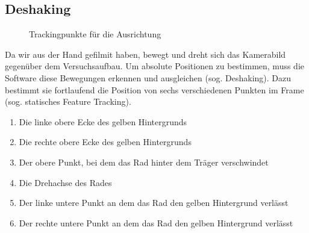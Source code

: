 \documentclass[a4paper,german,12pt,smallheadings]{scrartcl}
\begin{document}
\subsection{Deshaking}
\begin{figure}
  \caption{Trackingpunkte für die Ausrichtung}
\end{figure}

Da wir aus der Hand gefilmit haben, bewegt und dreht sich das Kamerabild
gegenüber dem Versuchsaufbau. Um absolute Positionen zu bestimmen, muss die
Software diese Bewegungen erkennen und ausgleichen (sog. Deshaking). Dazu
bestimmt sie fortlaufend die Position von sechs verschiedenen Punkten im Frame
(sog. statisches Feature Tracking).
\begin{enumerate}
  \item Die linke obere Ecke des gelben Hintergrunds
  \item Die rechte obere Ecke des gelben Hintergrunds
  \item Der obere Punkt, bei dem das Rad hinter dem Träger verschwindet
  \item Die Drehachse des Rades
  \item Der linke untere Punkt an dem das Rad den gelben Hintergrund verlässt
  \item Der rechte untere Punkt an dem das Rad den gelben Hintergrund verlässt
\end{enumerate}
\end{document}
